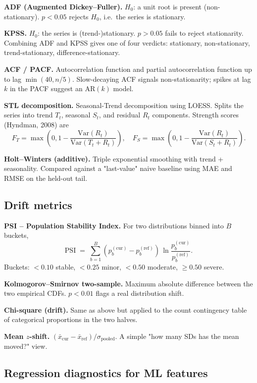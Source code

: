 \documentclass[11pt,a4paper]{article}
\begin{document}
\textbf{ADF (Augmented Dickey--Fuller).}
$H_0$: a unit root is present (non-stationary). $p < 0.05$ rejects $H_0$,
i.e.\ the series is stationary.

\textbf{KPSS.} $H_0$: the series is (trend-)stationary. $p > 0.05$ fails to
reject stationarity. Combining ADF and KPSS gives one of four verdicts:
stationary, non-stationary, trend-stationary, difference-stationary.

\textbf{ACF / PACF.} Autocorrelation function and partial autocorrelation
function up to lag $\min(40, n/5)$. Slow-decaying ACF signals
non-stationarity; spikes at lag $k$ in the PACF suggest an AR$(k)$ model.

\textbf{STL decomposition.} Seasonal-Trend decomposition using LOESS.
Splits the series into trend $T_t$, seasonal $S_t$, and residual $R_t$
components. Strength scores (Hyndman, 2008) are
\[
F_T = \max\!\left(0, 1 - \frac{\mathrm{Var}(R_t)}{\mathrm{Var}(T_t + R_t)}\right),
\quad
F_S = \max\!\left(0, 1 - \frac{\mathrm{Var}(R_t)}{\mathrm{Var}(S_t + R_t)}\right).
\]

\textbf{Holt--Winters (additive).} Triple exponential smoothing with
trend + seasonality. Compared against a "last-value" naive baseline using
MAE and RMSE on the held-out tail.

\subsection{Drift metrics}

\textbf{PSI -- Population Stability Index.} For two distributions binned
into $B$ buckets,
\[
\mathrm{PSI} \;=\; \sum_{b=1}^{B} (p_b^{(\mathrm{cur})} - p_b^{(\mathrm{ref})})\,
\ln \frac{p_b^{(\mathrm{cur})}}{p_b^{(\mathrm{ref})}}.
\]
Buckets: $<0.10$ stable, $<0.25$ minor, $<0.50$ moderate, $\geq 0.50$ severe.

\textbf{Kolmogorov--Smirnov two-sample.} Maximum absolute difference between
the two empirical CDFs. $p < 0.01$ flags a real distribution shift.

\textbf{Chi-square (drift).} Same as above but applied to the count
contingency table of categorical proportions in the two halves.

\textbf{Mean $z$-shift.} $(\bar{x}_{\mathrm{cur}} - \bar{x}_{\mathrm{ref}}) / \sigma_{\mathrm{pooled}}$.
A simple "how many SDs has the mean moved?" view.

\subsection{Regression diagnostics for ML features}
\end{document}
